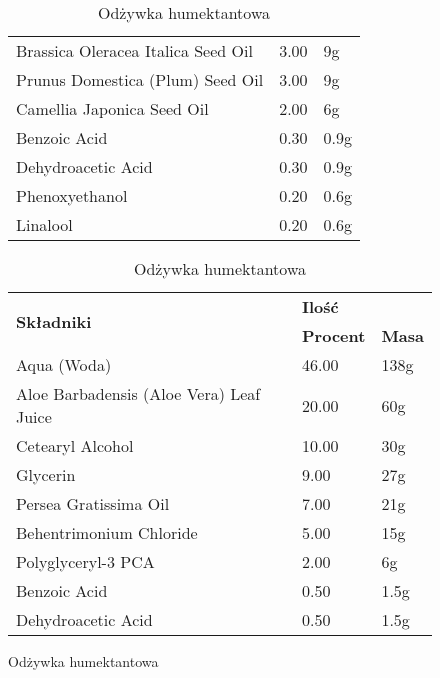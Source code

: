 \begin{table}[H]
\begin{footnotesize}
\begin{subfigure}[t]{0.5\textwidth}
\begin{tabular}{p{}ll}
				Brassica Oleracea Italica Seed Oil & 3.00 & 9g \\
				Prunus Domestica (Plum) Seed Oil & 3.00 & 9g \\
				Camellia Japonica Seed Oil & 2.00 & 6g \\
				Benzoic Acid & 0.30 & 0.9g \\
				Dehydroacetic Acid & 0.30 & 0.9g \\
				Phenoxyethanol & 0.20 & 0.6g \\
				Linalool & 0.20 & 0.6g \\
			\hline
		\end{tabular}
	\end{subfigure}

	\begin{subfigure}{0.5\textwidth}
		\centering
		\caption{Odżywka humektantowa}
		\begin{tabular}{p{}ll}
			\hline
			\multirow{2}{*}{\textbf{Składniki}} & \multicolumn{2}{l}{\textbf{Ilość}} \\
			\cline{2-3}
			& \textbf{Procent} & \textbf{Masa} \\
				\hline\hline
				Aqua (Woda) & 46.00 & 138g \\
				Aloe Barbadensis (Aloe Vera) Leaf Juice & 20.00 & 60g \\
				Cetearyl Alcohol & 10.00 & 30g \\
				Glycerin  & 9.00 & 27g \\
				Persea Gratissima Oil & 7.00 & 21g \\
				Behentrimonium Chloride & 5.00 & 15g \\
				Polyglyceryl-3 PCA & 2.00 & 6g \\
				Benzoic Acid & 0.50 & 1.5g \\
				Dehydroacetic Acid & 0.50 & 1.5g \\
				\hline
			\end{tabular}
	\end{subfigure}
\end{footnotesize}
\end{table}



